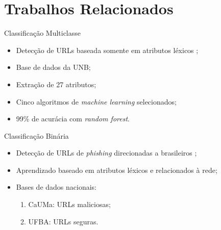 \documentclass{beamer}
\begin{document}
\section{Trabalhos Relacionados}

\begin{frame}{Classificação Multiclasse}
    
    \begin{itemize}
        \setlength{\itemsep}{10pt}
        \item Detecção de URLs baseada somente em atributos léxicos \cite{SALEEMRAJA2021163};
        \item Base de dados da UNB\footnotemark;
        \item Extração de 27 atributos;
        \item Cinco algoritmos de \emph{machine learning} selecionados;
        \item 99\% de acurácia com \emph{random forest}.
    \end{itemize}

    
\end{frame}

\begin{frame}{Classificação Binária}

    \begin{itemize}
        \setlength{\itemsep}{10pt}
        \item Detecção de URLs de \emph{phishing} direcionadas a brasileiros \cite{sbrc};
        \item Aprendizado baseado em atributos léxicos e relacionados à rede;
        \item Bases de dados nacionais:
        \begin{enumerate}
            \vspace{0.2cm}
            \setlength{\itemsep}{10pt}
            \item CaUMa\footnotemark: URLs maliciosas;
            \item UFBA\footnotemark: URLs seguras.
        \end{enumerate}
    \end{itemize}

    
\end{frame}
\end{document}
